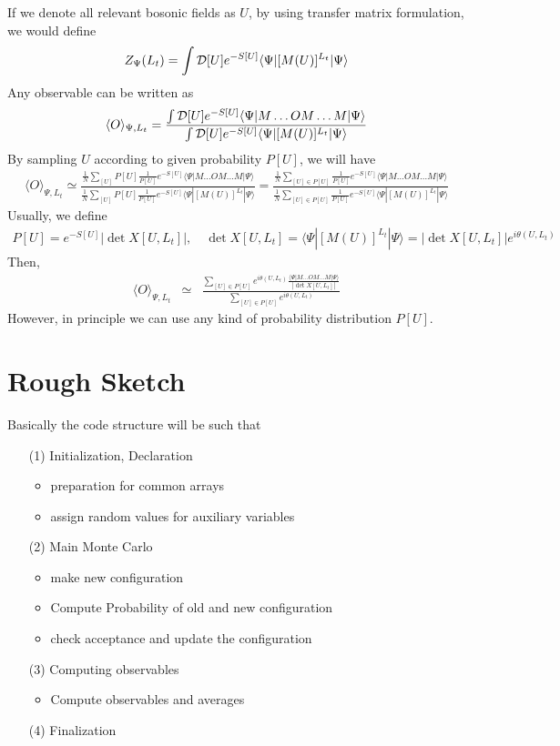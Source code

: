 \documentclass[10pt]{book}
\newcommand{\bea}{\begin{eqnarray}}
\newcommand{\eea}{\end{eqnarray}}
\def\la{\langle}
\def\ra{\rangle}
\begin{document}
If we denote all relevant bosonic fields as $U$, by using transfer matrix formulation,
we would define
\bea 
Z_{\Psi}(L_t)=\int {\cal D}[U] e^{-S[U]}\la \Psi| [M(U)]^{L_t}|\Psi\ra 
\eea 
Any observable can be written as
\bea 
\la O \ra_{\Psi,L_t}= \frac{\int {\cal D}[U] e^{-S[U]}\la \Psi| M\dots O M\dots M |\Psi\ra  }
         { \int {\cal D}[U] e^{-S[U]}\la \Psi| [M(U)]^{L_t}|\Psi\ra  }  
\eea 
By sampling $U$ according to given probability $P[U]$,
we will have 
\bea 
\la O \ra_{\Psi,L_t}\simeq  
          \frac{\frac{1}{N}\sum_{[U]} P[U] \frac{1}{P[U]}
                   e^{-S[U]}\la \Psi| M\dots O M\dots M |\Psi\ra  }
         { \frac{1}{N}\sum_{[U]} P[U] \frac{1}{P[U]} e^{-S[U]}\la \Psi| [M(U)]^{L_t}|\Psi\ra  }
         = \frac{\frac{1}{N}\sum_{[U]\in P[U]}  \frac{1}{P[U]}
                            e^{-S[U]}\la \Psi| M\dots O M\dots M |\Psi\ra  }
                  { \frac{1}{N}\sum_{[U]\in P[U]}  \frac{1}{P[U]} e^{-S[U]}\la \Psi| [M(U)]^{L_t}|\Psi\ra  } 
\eea 
Usually, we define  
\bea 
P[U]=e^{-S[U]}|\det X[U,L_t]|,\quad \det X[U,L_t] =\la \Psi| [M(U)]^{L_t}|\Psi\ra
                                    =|\det X[U,L_t]| e^{i\theta(U,L_t)}
\eea
Then,
\bea 
\la O \ra_{\Psi,L_t}&\simeq&\frac{\sum_{[U]\in P[U]}  e^{i\theta(U,L_t)}
                            \frac{\la \Psi| M\dots O M\dots M |\Psi\ra}{|\det X[U,L_t]|} }
                  { \sum_{[U]\in P[U]} e^{i\theta(U,L_t)}  } 
\eea 
However, in principle we can use any kind of probability distribution $P[U]$.
 
\section{Rough Sketch}
Basically the code structure will be such that
\begin{itemize}
\item[(1)] Initialization, Declaration
 \begin{itemize}
   \item preparation for common arrays
   \item assign random values for auxiliary variables 
 \end{itemize}
\item[(2)] Main Monte Carlo
 \begin{itemize}
   \item make new configuration
   \item Compute Probability of old and new configuration
   \item check acceptance and update the configuration 
 \end{itemize} 
\item[(3)] Computing observables
 \begin{itemize}
   \item Compute observables and averages
 \end{itemize} 
\item[(4)] Finalization 
\end{itemize}
\end{document}
